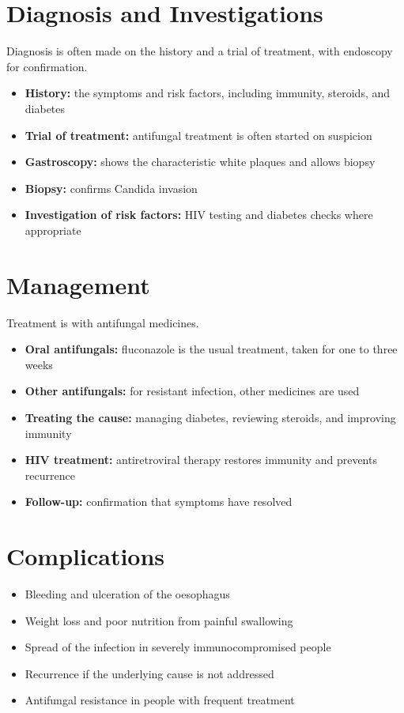 \section*{Diagnosis and Investigations}
Diagnosis is often made on the history and a trial of treatment, with endoscopy for confirmation.
\begin{itemize}
    \item \textbf{History:} the symptoms and risk factors, including immunity, steroids, and diabetes
    \item \textbf{Trial of treatment:} antifungal treatment is often started on suspicion
    \item \textbf{Gastroscopy:} shows the characteristic white plaques and allows biopsy
    \item \textbf{Biopsy:} confirms Candida invasion
    \item \textbf{Investigation of risk factors:} HIV testing and diabetes checks where appropriate
\end{itemize}

\section*{Management}
Treatment is with antifungal medicines.
\begin{itemize}
    \item \textbf{Oral antifungals:} fluconazole is the usual treatment, taken for one to three weeks
    \item \textbf{Other antifungals:} for resistant infection, other medicines are used
    \item \textbf{Treating the cause:} managing diabetes, reviewing steroids, and improving immunity
    \item \textbf{HIV treatment:} antiretroviral therapy restores immunity and prevents recurrence
    \item \textbf{Follow-up:} confirmation that symptoms have resolved
\end{itemize}

\section*{Complications}
\begin{itemize}
    \item Bleeding and ulceration of the oesophagus
    \item Weight loss and poor nutrition from painful swallowing
    \item Spread of the infection in severely immunocompromised people
    \item Recurrence if the underlying cause is not addressed
    \item Antifungal resistance in people with frequent treatment
\end{itemize}

